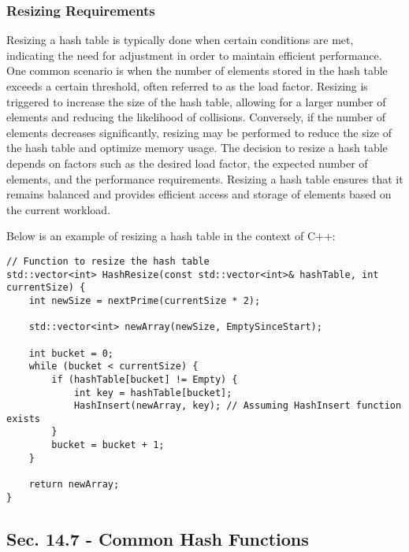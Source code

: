 \subsubsection{Resizing Requirements}

Resizing a hash table is typically done when certain conditions are met, indicating the need for adjustment in order to maintain efficient performance. One common scenario is when the number of elements stored 
in the hash table exceeds a certain threshold, often referred to as the load factor. Resizing is triggered to increase the size of the hash table, allowing for a larger number of elements and reducing the 
likelihood of collisions. Conversely, if the number of elements decreases significantly, resizing may be performed to reduce the size of the hash table and optimize memory usage. The decision to resize a hash 
table depends on factors such as the desired load factor, the expected number of elements, and the performance requirements. Resizing a hash table ensures that it remains balanced and provides efficient access 
and storage of elements based on the current workload.

\begin{solution}

Below is an example of resizing a hash table in the context of C++:

\horizontalline

\begin{verbatim}
// Function to resize the hash table
std::vector<int> HashResize(const std::vector<int>& hashTable, int currentSize) {
    int newSize = nextPrime(currentSize * 2);

    std::vector<int> newArray(newSize, EmptySinceStart);

    int bucket = 0;
    while (bucket < currentSize) {
        if (hashTable[bucket] != Empty) {
            int key = hashTable[bucket];
            HashInsert(newArray, key); // Assuming HashInsert function exists
        }
        bucket = bucket + 1;
    }

    return newArray;
}
\end{verbatim}

\horizontalline
    
\end{solution}

\subsection*{Sec. 14.7 - Common Hash Functions}


